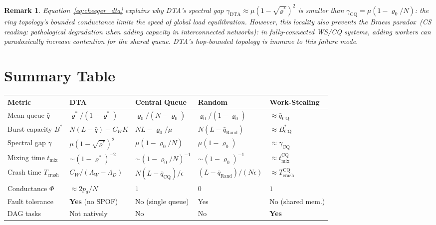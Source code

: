 \documentclass[11pt,a4paper]{report}
\newtheorem{remark}{Remark}[section]
\newcommand{\physics}[2]{#1\ \textnormal{(\emph{CS reading}: #2)}}
\begin{document}
\begin{remark}
Equation~\eqref{eq:cheeger_dta} explains why DTA's spectral gap
$\gamma_{\mathrm{DTA}} \approx \mu(1-\sqrt{\varrho^*})^2$ is smaller than
$\gamma_{\mathrm{CQ}} = \mu(1-\varrho_0/N)$: the ring topology's bounded conductance
limits the speed of global load equilibration.  However, this \emph{locality}
also prevents the \physics{Braess paradox}{pathological degradation when adding
capacity in interconnected networks}: in fully-connected WS/CQ systems,
adding workers can paradoxically increase contention for the shared queue.
DTA's hop-bounded topology is immune to this failure mode.
\end{remark}

\section{Summary Table}

\begin{center}
\renewcommand{\arraystretch}{1.4}
\begin{tabularx}{\textwidth}{@{}lXXXX@{}}
\toprule
Metric & DTA & Central Queue & Random & Work-Stealing \\
\midrule
Mean queue $\bar q$
  & $\varrho^*/(1-\varrho^*)$
  & $\varrho_0/(N-\varrho_0)$
  & $\varrho_0/(1-\varrho_0)$
  & $\approx \bar q_{\mathrm{CQ}}$ \\
Burst capacity $B^*$
  & $N(L-\bar q)+C_W K$
  & $NL - \varrho_0/\mu$
  & $N(L-\bar q_{\mathrm{Rand}})$
  & $\approx B^*_{\mathrm{CQ}}$ \\
Spectral gap $\gamma$
  & $\mu(1-\sqrt{\varrho^*})^2$
  & $\mu(1-\varrho_0/N)$
  & $\mu(1-\varrho_0)$
  & $\approx \gamma_{\mathrm{CQ}}$ \\
Mixing time $t_{\mathrm{mix}}$
  & $\sim(1-\varrho^*)^{-2}$
  & $\sim(1-\varrho_0/N)^{-1}$
  & $\sim(1-\varrho_0)^{-1}$
  & $\approx t_{\mathrm{mix}}^{\mathrm{CQ}}$ \\
Crash time $T_{\mathrm{crash}}$
  & $C_W/(\Lambda_W-\Lambda_D)$
  & $N(L-\bar q_{\mathrm{CQ}})/\epsilon$
  & $(L-\bar q_{\mathrm{Rand}})/(N\epsilon)$
  & $\approx T_{\mathrm{crash}}^{\mathrm{CQ}}$ \\
Conductance $\Phi$
  & $\approx 2p_d/N$
  & $1$
  & $0$
  & $1$ \\
Fault tolerance
  & \textbf{Yes} (no SPOF)
  & No (single queue)
  & Yes
  & No (shared mem.) \\
DAG tasks
  & Not natively
  & No
  & No
  & \textbf{Yes} \\
\bottomrule
\end{tabularx}
\end{center}
\end{document}
